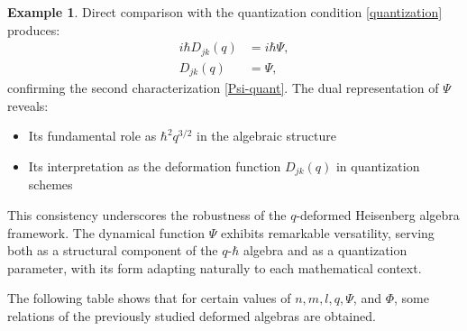 \documentclass[12pt,a4paper]{article}
\theoremstyle{plain}
\theoremstyle{definition}
\newtheorem{example}[theorem]{Example}
\theoremstyle{remark}
\begin{document}
\begin{example}
Direct comparison with the quantization condition \eqref{quantization} produces:
\begin{align*}
i\hbar D_{jk}(q) & = i\hbar\Psi,  \\
D_{jk}(q) & = \Psi, 
\end{align*}
confirming the second characterization \eqref{Psi-quant}. The dual representation of $\Psi$ reveals:
\begin{itemize}
\item Its fundamental role as $\hbar^{2}q^{3/2}$ in the algebraic structure
\item Its interpretation as the deformation function $D_{jk}(q)$ in quantization schemes
\end{itemize}
This consistency underscores the robustness of the $q$-deformed Heisenberg algebra framework. The dynamical function $\Psi$ exhibits remarkable versatility, serving both as a structural component of the $q$-$\hbar$ algebra and as a quantization parameter, with its form adapting naturally to each mathematical context.
\end{example}

The following table shows that for certain values of $n, m, l , q, \Psi$, and $\Phi$, some relations of the previously studied deformed algebras are obtained.
\end{document}
